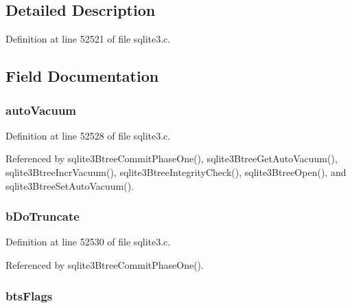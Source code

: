 \subsection{Detailed Description}


Definition at line 52521 of file sqlite3.\+c.



\subsection{Field Documentation}
\hypertarget{struct_bt_shared_a46c2b8ffc42df0dba008a602dc2269a4}{}
\subsubsection[{auto\+Vacuum}]{ auto\+Vacuum}\label{struct_bt_shared_a46c2b8ffc42df0dba008a602dc2269a4}


Definition at line 52528 of file sqlite3.\+c.



Referenced by sqlite3\+Btree\+Commit\+Phase\+One(), sqlite3\+Btree\+Get\+Auto\+Vacuum(), sqlite3\+Btree\+Incr\+Vacuum(), sqlite3\+Btree\+Integrity\+Check(), sqlite3\+Btree\+Open(), and sqlite3\+Btree\+Set\+Auto\+Vacuum().

\hypertarget{struct_bt_shared_a0e2268e3b24b632d2e9a345ee9c319c9}{}
\subsubsection[{b\+Do\+Truncate}]{ b\+Do\+Truncate}\label{struct_bt_shared_a0e2268e3b24b632d2e9a345ee9c319c9}


Definition at line 52530 of file sqlite3.\+c.



Referenced by sqlite3\+Btree\+Commit\+Phase\+One().

\hypertarget{struct_bt_shared_af9995be6d30d5d30d783b37074eab08e}{}
\subsubsection[{bts\+Flags}]{ bts\+Flags}\label{struct_bt_shared_af9995be6d30d5d30d783b37074eab08e}


